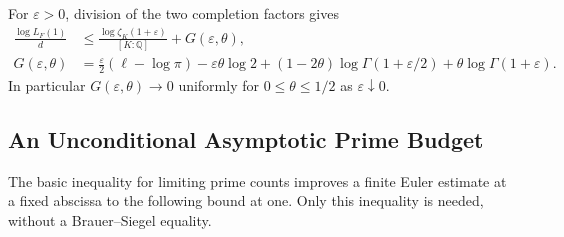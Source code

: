 For $\varepsilon>0$, division of the two completion factors gives
\begin{align}
 \frac{\log L_F(1)}d
 &\leq\frac{\log\zeta_K(1+\varepsilon)}{[K:\mathbb Q]}
           +G(\varepsilon,\theta),\label{an:finite-gamma}\\
 G(\varepsilon,\theta)
 &=\frac\varepsilon2(\ell-\log\pi)-\varepsilon\theta\log2
 +(1-2\theta)\log\Gamma(1+\varepsilon/2)
 +\theta\log\Gamma(1+\varepsilon).
 \label{an:gamma}
\end{align}
In particular $G(\varepsilon,\theta)\to0$ uniformly for
$0\leq\theta\leq1/2$ as $\varepsilon\downarrow0$.

\subsection{An Unconditional Asymptotic Prime Budget}

The basic inequality for limiting prime counts improves a finite Euler
estimate at a fixed abscissa to the following bound at one. Only this
inequality is needed, without a Brauer--Siegel equality.

